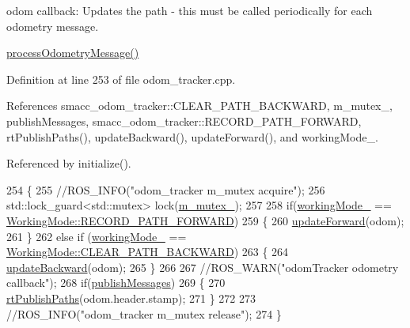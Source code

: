 odom callback\+: Updates the path -\/ this must be called periodically for each odometry message. 

\hyperlink{classsmacc__odom__tracker_1_1OdomTracker_adef7b87ba453ca86886239d875344de1}{process\+Odometry\+Message()} 

Definition at line 253 of file odom\+\_\+tracker.\+cpp.



References smacc\+\_\+odom\+\_\+tracker\+::\+C\+L\+E\+A\+R\+\_\+\+P\+A\+T\+H\+\_\+\+B\+A\+C\+K\+W\+A\+RD, m\+\_\+mutex\+\_\+, publish\+Messages, smacc\+\_\+odom\+\_\+tracker\+::\+R\+E\+C\+O\+R\+D\+\_\+\+P\+A\+T\+H\+\_\+\+F\+O\+R\+W\+A\+RD, rt\+Publish\+Paths(), update\+Backward(), update\+Forward(), and working\+Mode\+\_\+.



Referenced by initialize().


\begin{DoxyCode}
254 \{
255     \textcolor{comment}{//ROS\_INFO("odom\_tracker m\_mutex acquire");}
256     std::lock\_guard<std::mutex> lock(\hyperlink{classsmacc__odom__tracker_1_1OdomTracker_ad65e52bfd236e073940808c35f2bed8c}{m\_mutex\_});
257 
258     \textcolor{keywordflow}{if}(\hyperlink{classsmacc__odom__tracker_1_1OdomTracker_ad011432ae35a533fd61bae43179c3c36}{workingMode\_} == \hyperlink{namespacesmacc__odom__tracker_ade9730dd5cc10ccfad9362176cf46c33a989d06a586bcf9520889228da7faa643}{WorkingMode::RECORD\_PATH\_FORWARD})
259     \{
260         \hyperlink{classsmacc__odom__tracker_1_1OdomTracker_a7ef4ecc171a6fd37b2ed3c96a58e0659}{updateForward}(odom);
261     \}       
262     \textcolor{keywordflow}{else} \textcolor{keywordflow}{if} (\hyperlink{classsmacc__odom__tracker_1_1OdomTracker_ad011432ae35a533fd61bae43179c3c36}{workingMode\_} == \hyperlink{namespacesmacc__odom__tracker_ade9730dd5cc10ccfad9362176cf46c33a0cf8f27617189e35619df3c18bda6274}{WorkingMode::CLEAR\_PATH\_BACKWARD})
263     \{
264         \hyperlink{classsmacc__odom__tracker_1_1OdomTracker_a3a47119be9af27de9115b043d1f76fe7}{updateBackward}(odom);
265     \}
266 
267     \textcolor{comment}{//ROS\_WARN("odomTracker odometry callback");}
268     \textcolor{keywordflow}{if}(\hyperlink{classsmacc__odom__tracker_1_1OdomTracker_a5aaa7b76cae6ed70524d0f2ac04cbe70}{publishMessages})
269     \{
270         \hyperlink{classsmacc__odom__tracker_1_1OdomTracker_a8c9144a9d8b9ede7f45d06492496564c}{rtPublishPaths}(odom.header.stamp);
271     \}
272 
273     \textcolor{comment}{//ROS\_INFO("odom\_tracker m\_mutex release");}
274 \}
\end{DoxyCode}


